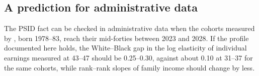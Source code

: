 \subsection{A prediction for administrative data}

The PSID fact can be checked in administrative data when the cohorts measured by \citet{chetty2020race}, born 1978--83,
reach their mid-forties between 2023 and 2028. If the profile documented here holds, the White--Black gap in the log
elasticity of individual earnings measured at 43--47 should be 0.25--0.30, against about 0.10 at 31--37 for the same
cohorts, while rank--rank slopes of family income should change by less.

